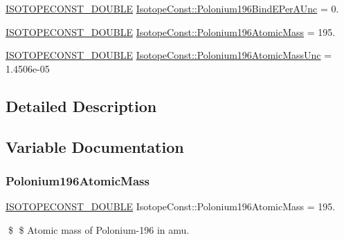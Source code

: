 \begin{DoxyCompactItemize}
\mbox{\hyperlink{group___isotope_const-_macros_ga8f45a7272ce02c0b4c65c44636ed719a}{I\+S\+O\+T\+O\+P\+E\+C\+O\+N\+S\+T\+\_\+\+D\+O\+U\+B\+LE}} \mbox{\hyperlink{group___isotope_const-_polonium-_po196_gaab29ab71c7fd5fad0df0b482e99c963b}{Isotope\+Const\+::\+Polonium196\+Bind\+E\+Per\+A\+Unc}} = 0.
\item 
\mbox{\hyperlink{group___isotope_const-_macros_ga8f45a7272ce02c0b4c65c44636ed719a}{I\+S\+O\+T\+O\+P\+E\+C\+O\+N\+S\+T\+\_\+\+D\+O\+U\+B\+LE}} \mbox{\hyperlink{group___isotope_const-_polonium-_po196_ga1d62ebca20c164869ec545b7c7845adb}{Isotope\+Const\+::\+Polonium196\+Atomic\+Mass}} = 195.
\item 
\mbox{\hyperlink{group___isotope_const-_macros_ga8f45a7272ce02c0b4c65c44636ed719a}{I\+S\+O\+T\+O\+P\+E\+C\+O\+N\+S\+T\+\_\+\+D\+O\+U\+B\+LE}} \mbox{\hyperlink{group___isotope_const-_polonium-_po196_ga2c3653adabf6baa4c42c84b3f09d2bef}{Isotope\+Const\+::\+Polonium196\+Atomic\+Mass\+Unc}} = 1.\+4506e-\/05
\end{DoxyCompactItemize}


\subsection{Detailed Description}


\subsection{Variable Documentation}
\mbox{\label{group___isotope_const-_polonium-_po196_ga1d62ebca20c164869ec545b7c7845adb}} 
\subsubsection{\texorpdfstring{Polonium196\+Atomic\+Mass}{Polonium196AtomicMass}}
{\footnotesize\ttfamily \mbox{\hyperlink{group___isotope_const-_macros_ga8f45a7272ce02c0b4c65c44636ed719a}{I\+S\+O\+T\+O\+P\+E\+C\+O\+N\+S\+T\+\_\+\+D\+O\+U\+B\+LE}} Isotope\+Const\+::\+Polonium196\+Atomic\+Mass = 195.}

\$ \$ Atomic mass of Polonium-\/196 in amu. \mbox{\label{group___isotope_const-_polonium-_po196_ga2c3653adabf6baa4c42c84b3f09d2bef}} 
